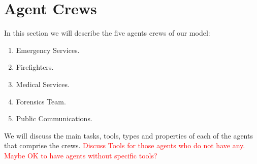 \section{Agent Crews}\label{sec:agents}
In this section we will describe the five agents crews of our model:
\begin{enumerate}
    \item Emergency Services.
    \item Firefighters.
    \item Medical Services.
    \item Forensics Team.
    \item Public Communications.
\end{enumerate}
We will discuss the main tasks, tools, types and properties of each of the agents that comprise the crews.
\newline\textcolor{red}{Discuss Tools for those agents who do not have any. Maybe OK to have agents without specific tools?}





